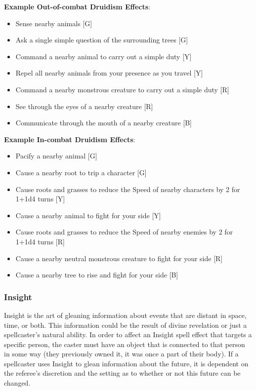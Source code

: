 \documentclass[oneside]{book}
\begin{document}
\begin{multicols}{2}
\textbf{Example Out-of-combat Druidism Effects}: 
	\begin{itemize}
		\setlength{\itemsep}{0cm}%
  		\setlength{\parskip}{0cm}%
		\item{ \small Sense nearby animals [G]}
		\item{ \small Ask a single simple question of the surrounding trees [G]}
		\item{ \small Command a nearby animal to carry out a simple duty [Y]}
		\item{ \small Repel all nearby animals from your presence as you travel [Y]}
		\item{ \small Command a nearby monstrous creature to carry out a simple duty [R]}
		\item{ \small See through the eyes of a nearby creature [R]}
		\item{ \small Communicate through the mouth of a nearby creature [B]}
	\end{itemize}
	
\textbf{Example In-combat Druidism Effects}: 
	\begin{itemize}
		\setlength{\itemsep}{0cm}%
  		\setlength{\parskip}{0cm}%
		\item{ \small Pacify a nearby animal [G]}
		\item{ \small Cause a nearby root to trip a character [G]}
		\item{ \small Cause roots and grasses to reduce the Speed of nearby characters by 2 for 1+1d4 turns [Y]}
		\item{ \small Cause a nearby animal to fight for your side [Y]}
		\item{ \small Cause roots and grasses to reduce the Speed of nearby enemies by 2 for 1+1d4 turns [R]}
		\item{ \small Cause a nearby neutral monstrous creature to fight for your side [R]}
		\item{ \small Cause a nearby tree to rise and fight for your side [B]}
	\end{itemize}

\subsubsection{Insight}
Insight is the art of gleaning information about events that are distant in space, time, or both. This information could be the result of divine revelation or just a spellcaster's natural ability. In order to affect an Insight spell effect that targets a specific person, the caster must have an object that is connected to that person in some way (they previously owned it, it was once a part of their body). If a spellcaster uses Insight to glean information about the future, it is dependent on the referee's discretion and the setting as to whether or not this future can be changed.


\end{multicols}
\end{document}
